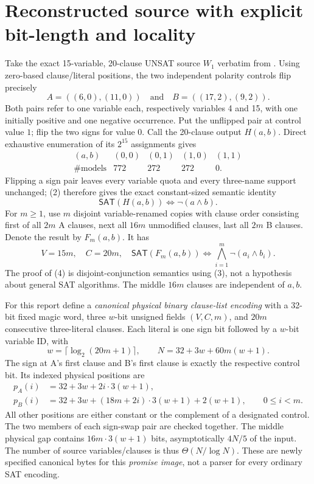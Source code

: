 \documentclass[11pt]{article}
\newcommand{\SAT}{\mathsf{SAT}}
\begin{document}
\section{Reconstructed source with explicit bit-length and locality}
Take the exact 15-variable, 20-clause UNSAT source $W_1$ verbatim from
.  Using
zero-based clause/literal positions, the two independent polarity controls
flip precisely
\[
 A=((6,0),(11,0))\quad\text{and}\quad
 B=((17,2),(9,2)).                                             \tag{1}
\]
Both pairs refer to one variable each, respectively variables 4 and 15,
with one initially positive and one negative occurrence. Put the unflipped
pair at control value $1$; flip the two signs for value $0$. Call the
20-clause output $H(a,b)$. Direct exhaustive enumeration of its
$2^{15}$ assignments gives
\[
\begin{array}{c|rrrr}
(a,b)&(0,0)&(0,1)&(1,0)&(1,1)\\\hline
\#\mathrm{models}&772&272&272&0.
\end{array}                                                       \tag{2}
\]
Flipping a sign pair leaves every variable quota and every three-name
support unchanged; (2) therefore gives the exact constant-sized semantic
identity
\[
                 \SAT(H(a,b))\iff \neg(a\land b).            \tag{3}
\]
For $m\ge1$, use $m$ disjoint variable-renamed copies with clause order
consisting first of all $2m$ A clauses, next all $16m$ unmodified
clauses, last all $2m$ B clauses.  Denote the result by
$F_m(a,b)$. It has
\[
 V=15m,\quad C=20m,\quad
 \SAT(F_m(a,b))\iff \bigwedge_{i=1}^{m}\neg(a_i\land b_i).
                                                                        \tag{4}
\]
The proof of (4) is disjoint-conjunction semantics using (3), not a
hypothesis about general SAT algorithms. The middle $16m$ clauses
are independent of $a,b$.

For this report define a \emph{canonical physical binary clause-list
encoding} with a 32-bit fixed magic word, three $w$-bit unsigned fields
$(V,C,m)$, and $20m$ consecutive three-literal clauses. Each literal is
one sign bit followed by a $w$-bit variable ID, with
\[
 w=\lceil\log_2(20m+1)\rceil,\qquad
 N=32+3w+60m(w+1).                                               \tag{5}
\]
The sign at A's first clause and B's first clause is exactly the
respective control bit. Its indexed physical positions are
\begin{align*}
 p_A(i)&=32+3w+2i\cdot 3(w+1),\\
 p_B(i)&=32+3w+(18m+2i)\cdot 3(w+1)+2(w+1),
 \qquad 0\le i<m.                                           \tag{6}
\end{align*}
All other positions are either constant or the complement of a designated
control.  The two members of each sign-swap pair are checked together.
The middle physical gap contains $16m\cdot3(w+1)$ bits, asymptotically
$4N/5$ of the input. The number of source variables/clauses is thus
$\Theta(N/\log N)$. These are newly specified canonical bytes for
this \emph{promise image}, not a parser for every ordinary SAT encoding.
\end{document}
